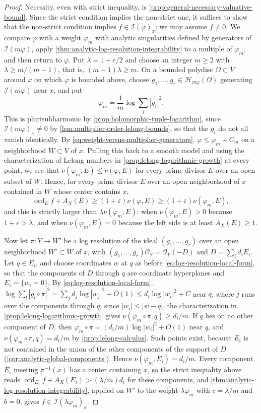 \begin{proof}
Necessity, even with strict inequality, is \cref{prop:general-necessary-valuative-bound}. Since the strict condition implies the non-strict one, it suffices to show that the non-strict condition implies $f\in\mathcal I(\varphi)_x$; we may assume $f\neq0$. We compare $\varphi$ with a weight $\varphi_m$ with analytic singularities defined by generators of $\mathcal I(m\varphi)$, apply \cref{thm:analytic-log-resolution-integrability} to a multiple of $\varphi_m$, and then return to $\varphi$. Put $\lambda=1+\varepsilon/2$ and choose an integer $m\geq2$ with $\lambda\geq m/(m-1)$, that is, $(m-1)\lambda\geq m$. On a bounded polydisc $\Omega\subset V$ around $x$ on which $\varphi$ is bounded above, choose $g_1,\ldots,g_r\in\mathcal H_{m\varphi}(\Omega)$ generating $\mathcal I(m\varphi)$ near $x$, and put
\[
 \varphi_m=\frac1m\log\sum_i|g_i|^2.
\]
This is plurisubharmonic by \cref{prop:holomorphic-tuple-logarithm}, since $\mathcal I(m\varphi)_x\neq0$ by \cref{lem:multiplier-order-lelong-bounds}, so that the $g_i$ do not all vanish identically. By \eqref{eq:weight-versus-multiplier-generators}, $\varphi\leq\varphi_m+C_m$ on a neighborhood $W\subset V$ of $x$. Pulling this back to a smooth model and using the characterization of Lelong numbers in \cref{prop:lelong-logarithmic-growth} at every point, we see that $\nu(\varphi_m,E)\leq\nu(\varphi,E)$ for every prime divisor $E$ over an open subset of $W$. Hence, for every prime divisor $E$ over an open neighborhood of $x$ contained in $W$ whose center contains $x$,
\[
 \operatorname{ord}_E f+A_X(E)\geq(1+\varepsilon)\nu(\varphi,E)\geq(1+\varepsilon)\nu(\varphi_m,E),
\]
and this is strictly larger than $\lambda\nu(\varphi_m,E)$: when $\nu(\varphi_m,E)>0$ because $1+\varepsilon>\lambda$, and when $\nu(\varphi_m,E)=0$ because the left side is at least $A_X(E)\geq1$.

Now let $\pi\colon Y\to W'$ be a log resolution of the ideal $(g_1,\ldots,g_r)$ over an open neighborhood $W'\subset W$ of $x$, with $(g_1,\ldots,g_r)\mathcal O_Y=\mathcal O_Y(-D)$ and $D=\sum_id_iE_i$. Let $q\in E_i$, and choose coordinates $w$ at $q$ as before \eqref{eq:log-resolution-local-form}, so that the components of $D$ through $q$ are coordinate hyperplanes and $E_i=\{w_i=0\}$. By \eqref{eq:log-resolution-local-form}, $\log\sum_l|g_l\circ\pi|^2=\sum_jd_j\log|w_j|^2+O(1)\leq d_i\log|w_i|^2+C$ near $q$, where $j$ runs over the components through $q$; since $|w_i|\leq|w-q|$, the characterization in \cref{prop:lelong-logarithmic-growth} gives $\nu(\varphi_m\circ\pi,q)\geq d_i/m$. If $q$ lies on no other component of $D$, then $\varphi_m\circ\pi=(d_i/m)\log|w_i|^2+O(1)$ near $q$, and $\nu(\varphi_m\circ\pi,q)=d_i/m$ by \cref{prop:lelong-calculus}. Such points exist, because $E_i$ is not contained in the union of the other components of the support of $D$ (\cref{cor:analytic-global-components}). Hence $\nu(\varphi_m,E_i)=d_i/m$. Every component $E_i$ meeting $\pi^{-1}(x)$ has a center containing $x$, so the strict inequality above reads $\operatorname{ord}_{E_i}f+A_X(E_i)>(\lambda/m)d_i$ for these components, and \cref{thm:analytic-log-resolution-integrability}, applied on $W'$ to the weight $\lambda\varphi_m$ with $c=\lambda/m$ and $b=0$, gives $f\in\mathcal I(\lambda\varphi_m)_x$.


\end{proof}
